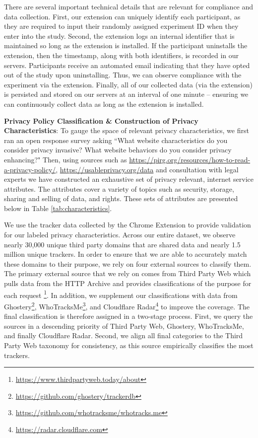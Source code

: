 \documentclass[12pt]{article}
\theoremstyle{definition}
\theoremstyle{remark}
\begin{document}
\begin{appendix}
There are several important technical details that are relevant for compliance and data collection. First, our extension can uniquely identify each participant, as they are required to input their randomly assigned experiment ID when they enter into the study. Second, the extension logs an internal identifier that is maintained so long as the extension is installed. If the participant uninstalls the extension, then the timestamp, along with both identifiers, is recorded in our servers. Participants receive an automated email indicating that they have opted out of the study upon uninstalling. Thus, we can observe compliance with the experiment via the extension. Finally, all of our collected data (via the extension) is persisted and stored on our servers at an interval of one minute -- ensuring we can continuously collect data as long as the extension is installed.

\vspace{0.5cm}

\noindent \textbf{Privacy Policy Classification \& Construction of Privacy Characteristics}: To gauge the space of relevant privacy characteristics, we first ran an open response survey asking ``What website characteristics do you consider privacy invasive? What website behaviors do you consider privacy enhancing?" Then, using sources such as \url{https://pirg.org/resources/how-to-read-a-privacy-policy/},  \url{ https://usableprivacy.org/data} and consultation with legal experts we have constructed an exhaustive set of privacy relevant, internet service attributes. The attributes cover a variety of topics such as security, storage, sharing and selling of data, and rights. These sets of attributes are presented below in Table \ref{tab:characteristics}.

We use the tracker data collected by the Chrome Extension to provide validation for our labeled privacy characteristics. Across our entire dataset, we observe nearly 30,000 unique third party domains that are shared data and nearly 1.5 million unique trackers. %
In order to ensure that we are able to accurately match these domains to their purpose, we rely on four external sources to classify them. The primary external source that we rely on comes from Third Party Web which pulls data from the HTTP Archive and provides classifications of the purpose for each request \footnote{\url{https://www.thirdpartyweb.today/about}}. In addition, we supplement our classifications with data from Ghostery\footnote{\url{ https://github.com/ghostery/trackerdb}}, WhoTracksMe\footnote{\url{https://github.com/whotracksme/whotracks.me}}, and Cloudflare Radar\footnote{\url{https://radar.cloudflare.com}} to improve the coverage. The final classification is therefore assigned in a two-stage process. First, we query the sources in a descending priority of Third Party Web, Ghostery, WhoTracksMe, and finally Cloudflare Radar. Second, we align all final categories to the Third Party Web taxonomy for consistency, as this source empirically classifies the most trackers.


\end{appendix}
\end{document}
